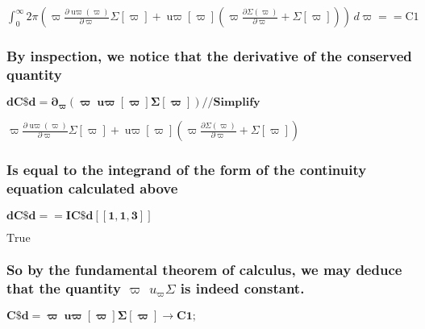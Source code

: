 \documentclass{article}
\begin{document}
\begin{doublespace}
\noindent\(\int_0^{\infty } 2 \pi  \left(\varpi  \frac{\partial \text{u$\varpi $}(\varpi )}{\partial \varpi } \Sigma [\varpi ]+\text{u$\varpi $}[\varpi
] \left(\varpi  \frac{\partial \Sigma (\varpi )}{\partial \varpi }+\Sigma [\varpi ]\right)\right) \, d\varpi ==\text{C1}\)
\end{doublespace}

\subsubsection*{By inspection, we notice that the derivative of the conserved quantity}

\begin{doublespace}
\noindent\(\pmb{\text{dC$\$$d} = \partial _{\varpi }(\varpi  \text{u$\varpi $}[\varpi ] \Sigma [\varpi ]) \text{//}\text{Simplify}}\)
\end{doublespace}

\begin{doublespace}
\noindent\(\varpi  \frac{\partial \text{u$\varpi $}(\varpi )}{\partial \varpi } \Sigma [\varpi ]+\text{u$\varpi $}[\varpi ] \left(\varpi  \frac{\partial
\Sigma (\varpi )}{\partial \varpi }+\Sigma [\varpi ]\right)\)
\end{doublespace}

\subsubsection*{Is equal to the integrand of the form of the continuity equation calculated above}

\begin{doublespace}
\noindent\(\pmb{\text{dC$\$$d} == \text{IC$\$$d}[[1,1,3]] }\)
\end{doublespace}

\begin{doublespace}
\noindent\(\text{True}\)
\end{doublespace}

\subsubsection*{So by the fundamental theorem of calculus, we may deduce that the quantity $\varpi $ \(u_{\varpi }\Sigma\) is indeed constant.}

\begin{doublespace}
\noindent\(\pmb{\text{C$\$$d} = \varpi  \text{u$\varpi $}[\varpi ] \Sigma [\varpi ] \to  \text{C1};}\)
\end{doublespace}
\end{document}
